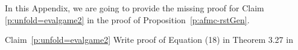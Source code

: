 \noindent



In this Appendix, we are going to provide the missing proof for Claim \ref{p:unfold=evalgame2} in the proof of Proposition~\ref{p:afmc-rstGen}.


\begin{proofof}{Claim~\ref{p:unfold=evalgame2}}
Write proof of Equation (18) in Theorem 3.27 in \cite{Ven08}

\end{proofof}